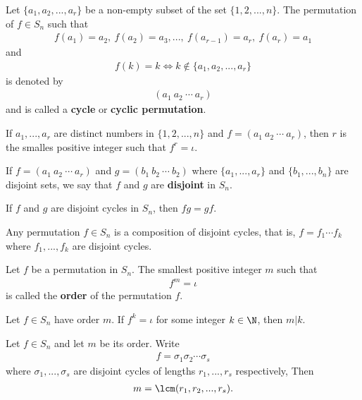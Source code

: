 \documentclass{article}
\begin{document}
\begin{definition}
    Let $\{a_1, a_2, ...,a_r\}$ be a non-empty subset of the set $\{1,2,...,n\}$. The permutation of $f\in S_n$ such that
    \begin{align*}
        f(a_1)=a_2,\: f(a_2)=a_3,...,\: f(a_{r-1})=a_r,\: f(a_r)=a_1
    \end{align*}
    and
    \begin{align*}
        f(k)=k \Leftrightarrow k\not\in \{a_1,a_2,...,a_r\}
    \end{align*}
    is denoted by
    \begin{align*}
        (a_1\:a_2\:\cdots\:a_r)
    \end{align*}
    and is called a \textbf{cycle} or \textbf{cyclic permutation}.
\end{definition}
\begin{corollary}
    If $a_1, ..., a_r$ are distinct numbers in $\{1,2,...,n\}$ and $f=(a_1\: a_2\: \cdots \: a_r)$, then $r$ is the smalles positive integer such that $f^r=\iota$.
\end{corollary}
\begin{definition}
    If $f=(a_1\:a_2\:\cdots\: a_r)$ and $g=(b_1\:b_2\:\cdots\:b_2)$ where $\{a_1,...,a_r\}$ and $\{b_1,..., b_n\}$ are disjoint sets, we say that $f$ and $g$ are \textbf{disjoint} in $S_n$.
\end{definition}
\begin{proposition}
    If $f$ and $g$ are disjoint cycles in $S_n$, then $fg=gf$.
\end{proposition}
\begin{theorem}
    Any permutation $f\in S_n$ is a composition of disjoint cycles, that is, $f=f_1\cdots f_k$ where $f_1,...,f_k$ are disjoint cycles.
\end{theorem}
\begin{definition}
    Let $f$ be a permutation in $S_n$. The smallest positive integer $m$ such that
    \begin{align*}
        f^m = \iota
    \end{align*}
    is called the \textbf{order} of the permutation $f$.
\end{definition}
\begin{lemma}
    Let $f\in S_n$ have order $m$. If $f^k=\iota$ for some integer $k\in\N$, then $m|k$.
\end{lemma}
\begin{lemma}
    Let $f\in S_n$ and let $m$ be its order. Write
    \begin{align*}
        f=\sigma_1\sigma_2\cdots \sigma_s
    \end{align*}
    where $\sigma_1,...,\sigma_s$ are disjoint cycles of lengths $r_1, ..., r_s$ respectively, Then
    \begin{align*}
        m=\lcm(r_1,r_2,...,r_s).
    \end{align*}
\end{lemma}
\end{document}
